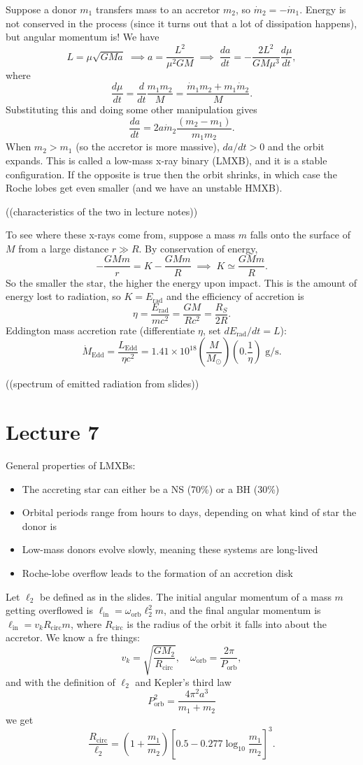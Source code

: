 \documentclass[../a122main.tex]{subfiles}
\begin{document}
Suppose a donor $m_1$ transfers mass to an accretor $m_2$, so $\dot m_2 = -\dot m_1$.
Energy is not conserved in the process (since it turns out that a lot of dissipation happens), but angular momentum is!
We have
\[ L = \mu \sqrt{G M a} \;\implies a = \frac{L^2}{\mu^2 GM} \;\implies\; \frac{da}{dt} = -\frac{2L^2}{GM \mu^3} \frac{d\mu}{dt}, \]
where
\[ \frac{d\mu}{dt} = \frac{d}{dt} \frac{m_1m_2}{M} = \frac{\dot m_1 m_2 + m_1 \dot m_2}{M}. \]
Substituting this and doing some other manipulation gives
\[ \frac{da}{dt} = 2 a \dot m_2 \frac{(m_2 - m_1)}{m_1 m_2}. \]
When $m_2 > m_1$ (so the accretor is more massive), $da / dt > 0$ and the orbit expands.
This is called a low-mass x-ray binary (LMXB), and it is a stable configuration.
If the opposite is true then the orbit shrinks, in which case the Roche lobes get even smaller (and we have an unstable HMXB).

((characteristics of the two in lecture notes))

To see where these x-rays come from, suppose a mass $m$ falls onto the surface of $M$ from a large distance $r \gg R$.
By conservation of energy,
\[ -\frac{GMm}{r} = K - \frac{GMm}{R} \;\implies\; K \simeq \frac{GMm}{R}. \]
So the smaller the star, the higher the energy upon impact.
This is the amount of energy lost to radiation, so $K = E_\text{rad}$ and the efficiency of accretion is
\[ \eta = \frac{E_\text{rad}}{mc^2} = \frac{GM}{Rc^2} = \frac{R_S}{2R}. \]
Eddington mass accretion rate (differentiate $\eta$, set $dE_\textrm{rad} / dt = L$):
\[ \dot M_\textrm{Edd} = \frac{L_\textrm{Edd}}{\eta c^2} = 1.41 \times 10^{18} \left( \frac{M}{M_\odot} \right) \left( 0.\frac{1}{\eta} \right) \text{ g/s}. \]

((spectrum of emitted radiation from slides))

\section{Lecture 7}
General properties of LMXBs:
\begin{itemize}[topsep=0pt]
    \item The accreting star can either be a NS (70\%) or a BH (30\%)
    \item Orbital periods range from hours to days, depending on what kind of star the donor is
    \item Low-mass donors evolve slowly, meaning these systems are long-lived
    \item Roche-lobe overflow leads to the formation of an accretion disk
\end{itemize}
Let $\ell_2$ be defined as in the slides.
The initial angular momentum of a mass $m$ getting overflowed is $\ell_\textrm{in} = \omega_\textrm{orb} \ell_2^2 m$, and the final angular momentum is $\ell_\textrm{in} = v_k R_\textrm{circ} m$, where $R_\textrm{circ}$ is the radius of the orbit it falls into about the accretor.
We know a fre things:
\[ v_k = \sqrt{\frac{GM_2}{R_\textrm{circ}}}, \quad \omega_\textrm{orb} = \frac{2\pi}{P_\textrm{orb}}, \]
and with the definition of $\ell_2$ and Kepler's third law
\[ P_\textrm{orb}^2 = \frac{4\pi^2 a^3}{m_1 + m_2} \]
we get
\[ \frac{R_\textrm{circ}}{\ell_2} = \left( 1 + \frac{m_1}{m_2} \right) \left[ 0.5 - 0.277 \log_{10} \frac{m_1}{m_2} \right]^3. \]
\end{document}
